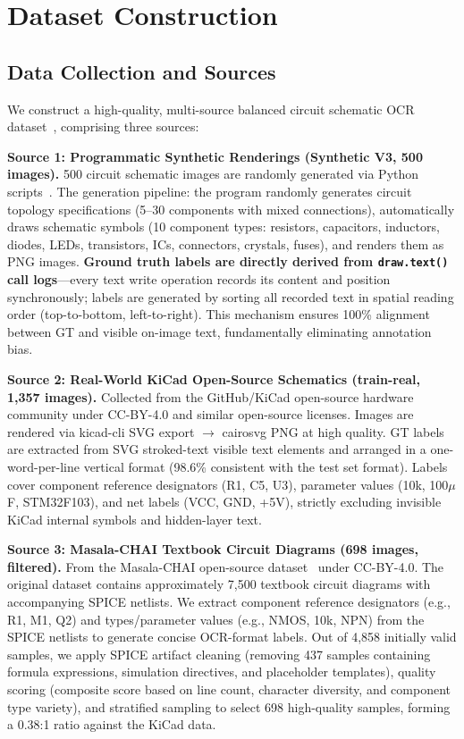 \section{Dataset Construction}

\subsection{Data Collection and Sources}

We construct a high-quality, multi-source balanced circuit schematic OCR dataset~\citep{zhang2026circuitocrfinal}, comprising three sources:

\textbf{Source 1: Programmatic Synthetic Renderings (Synthetic V3, 500 images).} 500 circuit schematic images are randomly generated via Python scripts~\citep{zhang2026circuitocr}. The generation pipeline: the program randomly generates circuit topology specifications (5--30 components with mixed connections), automatically draws schematic symbols (10 component types: resistors, capacitors, inductors, diodes, LEDs, transistors, ICs, connectors, crystals, fuses), and renders them as PNG images. \textbf{Ground truth labels are directly derived from \texttt{draw.text()} call logs}---every text write operation records its content and position synchronously; labels are generated by sorting all recorded text in spatial reading order (top-to-bottom, left-to-right). This mechanism ensures 100\% alignment between GT and visible on-image text, fundamentally eliminating annotation bias.

\textbf{Source 2: Real-World KiCad Open-Source Schematics (train-real, 1,357 images).} Collected from the GitHub/KiCad open-source hardware community under CC-BY-4.0 and similar open-source licenses. Images are rendered via kicad-cli SVG export $\to$ cairosvg PNG at high quality. GT labels are extracted from SVG stroked-text visible text elements and arranged in a one-word-per-line vertical format (98.6\% consistent with the test set format). Labels cover component reference designators (R1, C5, U3), parameter values (10k, 100$\mu$F, STM32F103), and net labels (VCC, GND, +5V), strictly excluding invisible KiCad internal symbols and hidden-layer text.

\textbf{Source 3: Masala-CHAI Textbook Circuit Diagrams (698 images, filtered).} From the Masala-CHAI open-source dataset~\citep{bhandari2025masalachai} under CC-BY-4.0. The original dataset contains approximately 7,500 textbook circuit diagrams with accompanying SPICE netlists. We extract component reference designators (e.g., R1, M1, Q2) and types/parameter values (e.g., NMOS, 10k, NPN) from the SPICE netlists to generate concise OCR-format labels. Out of 4,858 initially valid samples, we apply SPICE artifact cleaning (removing 437 samples containing formula expressions, simulation directives, and placeholder templates), quality scoring (composite score based on line count, character diversity, and component type variety), and stratified sampling to select 698 high-quality samples, forming a 0.38:1 ratio against the KiCad data.

